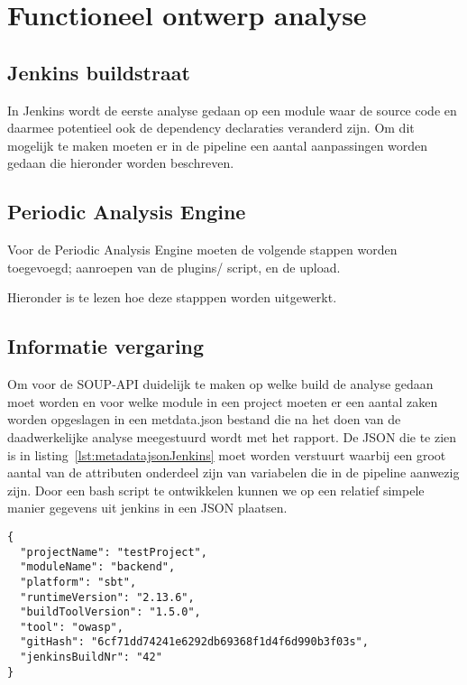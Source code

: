 \chapter{Functioneel ontwerp analyse}\label{ch:impl-Jenkins}


\section{Jenkins buildstraat}\label{sec:jenkins-buildtstraat}
In Jenkins wordt de eerste analyse gedaan op een module waar de source code en daarmee potentieel ook de dependency declaraties veranderd zijn.
Om dit mogelijk te maken moeten er in de pipeline een aantal aanpassingen worden gedaan die hieronder worden beschreven.

\section{Periodic Analysis Engine}\label{sec:pae-builstraat}
Voor de Periodic Analysis Engine moeten de volgende stappen worden toegevoegd; aanroepen van de plugins/ script, en de upload.

Hieronder is te lezen hoe deze stapppen worden uitgewerkt.

\section{Informatie vergaring}\label{sec:informatie-vergaring}
Om voor de SOUP-API duidelijk te maken op welke build de analyse gedaan moet worden en voor welke module in een project moeten er een aantal zaken worden opgeslagen in een metdata.json bestand die na het doen van de daadwerkelijke analyse meegestuurd wordt met het rapport. De JSON die te zien is in listing~\ref{lst:metadatajsonJenkins} moet worden verstuurt waarbij een groot aantal van de attributen onderdeel zijn van variabelen die in de pipeline aanwezig zijn.
Door een bash script te ontwikkelen kunnen we op een relatief simpele manier gegevens uit jenkins in een JSON plaatsen.

\begin{lstlisting}[caption={metadata JSON object behorende bij de case class}, label={lst:metadatajsonJenkins}]
{
  "projectName": "testProject",
  "moduleName": "backend",
  "platform": "sbt",
  "runtimeVersion": "2.13.6",
  "buildToolVersion": "1.5.0",
  "tool": "owasp",
  "gitHash": "6cf71dd74241e6292db69368f1d4f6d990b3f03s",
  "jenkinsBuildNr": "42"
}
\end{lstlisting}

